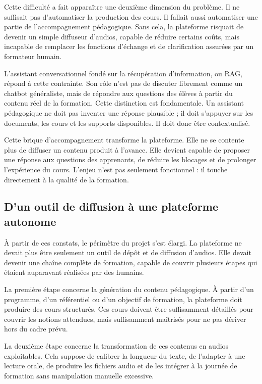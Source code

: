 Cette difficulté a fait apparaître une deuxième dimension du problème. Il ne suffisait pas
d'automatiser la production des cours. Il fallait aussi automatiser une partie de
l'accompagnement pédagogique. Sans cela, la plateforme risquait de devenir un simple
diffuseur d'audios, capable de réduire certains coûts, mais incapable de remplacer les
fonctions d'échange et de clarification assurées par un formateur humain.

L'assistant conversationnel fondé sur la récupération d'information, ou RAG, répond à
cette contrainte. Son rôle n'est pas de discuter librement comme un chatbot généraliste,
mais de répondre aux questions des élèves à partir du contenu réel de la formation. Cette
distinction est fondamentale. Un assistant pédagogique ne doit pas inventer une réponse
plausible ; il doit s'appuyer sur les documents, les cours et les supports disponibles. Il
doit donc être contextualisé.

Cette brique d'accompagnement transforme la plateforme. Elle ne se contente plus de
diffuser un contenu produit à l'avance. Elle devient capable de proposer une réponse aux
questions des apprenants, de réduire les blocages et de prolonger l'expérience du cours.
L'enjeu n'est pas seulement fonctionnel : il touche directement à la qualité de la formation.

\subsection{D'un outil de diffusion à une plateforme autonome}

À partir de ces constats, le périmètre du projet s'est élargi. La plateforme ne devait plus
être seulement un outil de dépôt et de diffusion d'audios. Elle devait devenir une chaîne
complète de formation, capable de couvrir plusieurs étapes qui étaient auparavant
réalisées par des humains.

La première étape concerne la génération du contenu pédagogique. À partir d'un
programme, d'un référentiel ou d'un objectif de formation, la plateforme doit produire
des cours structurés. Ces cours doivent être suffisamment détaillés pour couvrir les
notions attendues, mais suffisamment maîtrisés pour ne pas dériver hors du cadre prévu.

La deuxième étape concerne la transformation de ces contenus en audios exploitables.
Cela suppose de calibrer la longueur du texte, de l'adapter à une lecture orale, de produire
les fichiers audio et de les intégrer à la journée de formation sans manipulation manuelle
excessive.


